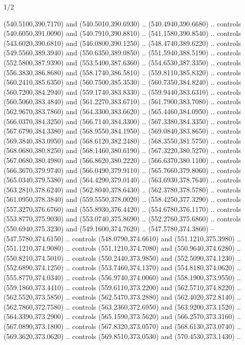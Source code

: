 \begin{flagdescription}{1/2}
\begin{scope}[xshift=0.5\flaglength,yshift=0.5\flagwidth,scale=\flagwidth/759]
\begin{scope}[y=0.8pt, x=0.8pt, yscale=-1,shift={(-720,-480)}]
\begin{scope}[cm={{1.14637,0.0,0.0,1.17117,(33.17849,82.1384)}}]
  (540.5100,390.7170) and (540.5010,390.6930) .. (540.4940,390.6680) .. controls
  (540.6050,391.0090) and (540.7910,390.8810) .. (541.1580,390.8540) .. controls
  (543.6020,390.6810) and (546.0800,390.1250) .. (548.4740,389.6220) .. controls
  (549.5560,389.3940) and (550.6350,389.0850) .. (551.5940,388.5190) .. controls
  (552.5800,387.9390) and (553.5400,387.6360) .. (554.6530,387.3350) .. controls
  (556.3830,386.8680) and (558.1740,386.5810) .. (559.8110,385.8320) .. controls
  (560.2410,385.6350) and (560.7500,385.3530) .. (560.7350,384.8240) .. controls
  (560.7200,384.2940) and (559.1740,383.8330) .. (559.9440,383.6310) .. controls
  (560.5060,383.4840) and (561.2270,383.6710) .. (561.7900,383.7080) .. controls
  (562.9670,383.7860) and (564.3300,383.6620) .. (565.4460,384.0950) .. controls
  (566.0370,384.3250) and (566.7140,384.3300) .. (567.3380,384.3350) .. controls
  (567.6790,384.3380) and (568.9550,384.1950) .. (569.0840,383.8650) .. controls
  (569.3840,383.0950) and (568.6120,382.2480) .. (568.3550,381.5750) .. controls
  (568.0680,380.8250) and (568.1460,380.6190) .. (567.3220,380.5270) .. controls
  (567.0680,380.4980) and (566.8620,380.2220) .. (566.6370,380.1100) .. controls
  (566.3670,379.9740) and (566.0490,379.9110) .. (565.7660,379.8060) .. controls
  (565.0340,379.5380) and (564.4290,379.0140) .. (563.6930,378.7640) .. controls
  (563.2810,378.6240) and (562.8040,378.6430) .. (562.3780,378.5780) .. controls
  (561.0950,378.3840) and (559.5550,378.0020) .. (558.4250,377.3290) .. controls
  (557.3270,376.6760) and (555.8930,376.4420) .. (554.6780,376.1170) .. controls
  (553.8770,375.9030) and (553.0740,375.8690) .. (552.2760,375.6860) .. controls
  (550.6940,375.3230) and (549.1600,374.7620) .. (547.5780,374.3860) --
  (547.5780,374.6150) .. controls (548.0790,374.6610) and (551.1210,375.3980) ..
  (551.1210,374.9080) .. controls (551.1210,374.7080) and (550.9640,374.6280) ..
  (550.8210,374.5010) .. controls (550.2440,373.9850) and (552.5090,374.1230) ..
  (552.6890,374.1250) .. controls (553.7460,374.1370) and (554.8180,374.0620) ..
  (555.8770,374.0340) .. controls (556.9740,374.0060) and (558.1900,373.9550) ..
  (559.1860,373.4410) .. controls (559.6110,373.2200) and (562.5710,374.8220) ..
  (562.5520,373.5850) .. controls (562.5470,373.2880) and (562.4020,372.8140) ..
  (562.7860,372.7580) .. controls (563.2360,372.6950) and (563.9200,373.1520) ..
  (564.3390,373.2900) .. controls (565.1590,373.5620) and (566.2570,373.3160) ..
  (567.0890,373.1800) .. controls (567.8320,373.0570) and (568.6130,373.0740) ..
  (569.3620,373.0620) .. controls (569.8510,373.0530) and (570.4530,373.1430) ..

\end{scope}
\end{scope}
\end{scope}
\end{flagdescription}
